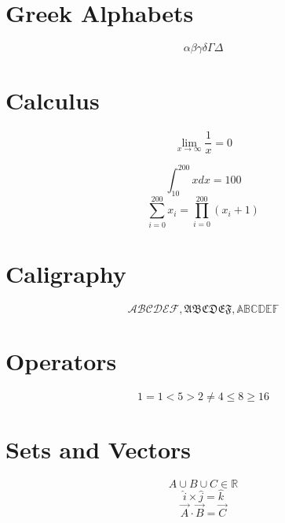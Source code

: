 \documentclass[a4paper, 12pt]{article}
\begin{document}
	\section{Greek Alphabets}
	\begin{equation}
		\alpha \beta \gamma \delta \Gamma \Delta
	\end{equation}
	
	\section{Calculus}
	\begin{equation}
		\lim_{x \rightarrow \infty} \frac{1}{x} = 0
	\end{equation}
	
	\begin{equation}
		\int_{10}^{200} x dx = 100
	\end{equation}
	\begin{equation}
		\sum_{i=0}^{200} x_i = \prod_{i=0}^{200} (x_i + 1)
	\end{equation}
	
	\section{Caligraphy}
	\begin{equation}
		\mathcal{ABCDEF}, \mathfrak{ABCDEF}, \mathbb{ABCDEF}
	\end{equation}
	
	\section{Operators}
	\begin{equation}
		1 = 1 <5 > 2 \neq 4 \leq 8 \geq 16
	\end{equation}
	
	\section{Sets and Vectors}
	\begin{equation}
		A \cup B \cup C \in \mathbb{R}
	\end{equation}
	\begin{equation}
		\hat{i} \times \hat{j} = \hat{k}
	\end{equation}
	\begin{equation}
		\vec{A} \cdot \vec{B} = \vec{C}
	\end{equation}
	
\end{document}
